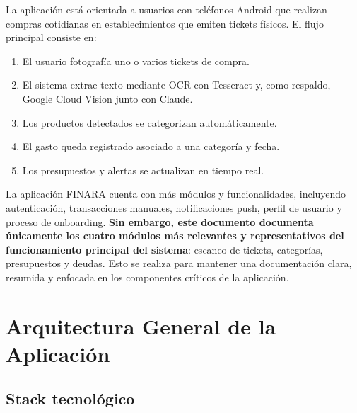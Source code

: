 \documentclass[12pt, letterpaper]{article}
\begin{document}
La aplicación está orientada a usuarios con teléfonos Android que realizan
compras cotidianas en establecimientos que emiten tickets físicos. El flujo
principal consiste en:

\begin{enumerate}
  \item El usuario fotografía uno o varios tickets de compra.
  \item El sistema extrae texto mediante OCR con Tesseract y, como respaldo,
        Google Cloud Vision junto con Claude.
  \item Los productos detectados se categorizan automáticamente.
  \item El gasto queda registrado asociado a una categoría y fecha.
  \item Los presupuestos y alertas se actualizan en tiempo real.
\end{enumerate}

\begin{infobox}
  La aplicación FINARA cuenta con más módulos y funcionalidades, incluyendo
  autenticación, transacciones manuales, notificaciones push, perfil de
  usuario y proceso de onboarding. \textbf{Sin embargo, este documento
  documenta únicamente los cuatro módulos más relevantes y representativos
  del funcionamiento principal del sistema}: escaneo de tickets, categorías,
  presupuestos y deudas. Esto se realiza para mantener una documentación
  clara, resumida y enfocada en los componentes críticos de la aplicación.
\end{infobox}


\section{Arquitectura General de la Aplicación}

\subsection{Stack tecnológico}
\end{document}
